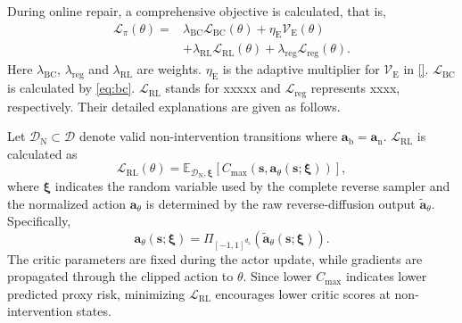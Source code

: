 \documentclass[9pt,journal]{IEEEtran}
\newcommand{\D}{\mathcal{D}}
\newcommand{\DN}{\mathcal{D}_{\mathrm{N}}}
\newcommand{\E}{\mathbb{E}}
\newcommand{\va}{\bm{a}}
\newcommand{\vs}{\bm{s}}
\newcommand{\van}{\ensuremath{\va_{\mathrm n}}}      %
\newcommand{\vab}{\ensuremath{\va_{\mathrm b}}}      %
\begin{document}
During online repair, a comprehensive objective is calculated, that is,
\begin{equation}
    \begin{aligned}
        \mathcal{L}_{\pi}(\theta)
        ={}&
        \lambda_{\mathrm{BC}}
        \mathcal{L}_{\mathrm{BC}}(\theta)
        +
        \eta_{\mathrm{E}}
        \mathcal{V}_{\mathrm{E}}(\theta)
        \\
        &+
        \lambda_{\mathrm{RL}}
        \mathcal{L}_{\mathrm{RL}}(\theta)
        +
        \lambda_{\mathrm{reg}}
        \mathcal{L}_{\mathrm{reg}}(\theta).
    \end{aligned}
    \label{eq:actorloss}
\end{equation}
Here $\lambda_{\mathrm{BC}}$, $\lambda_{\mathrm{reg}}$ and $\lambda_{\mathrm{RL}}$ are weights.
$\eta_{\mathrm E}$ is the adaptive multiplier for
$\mathcal V_{\mathrm E}$ in \eqref{}.%
$\mathcal{L}_{\mathrm{BC}}$ is calculated by \eqref{eq:bc}.
$\mathcal{L}_{\mathrm{RL}}$ stands for xxxxx and $\mathcal{L}_{\mathrm{reg}}$ represents xxxx, respectively.
Their detailed explanations are given as follows.

Let $\DN\subset\D$ denote valid non-intervention
transitions where $\vab=\van$. $\mathcal{L}_{\mathrm{RL}}$ is calculated as
\begin{equation}
    \mathcal{L}_{\mathrm{RL}}(\theta)
    =
    \E_{\DN,\bm\xi}
    \left[
    C_{\max}
    \left(
    \vs,
    \va_\theta\!\left(\vs;\bm\xi\right)
    \right)
    \right],
    \label{eq:actor_rl}
\end{equation}
where $\bm\xi$ indicates the random variable used by the complete
reverse sampler and the normalized action $\va_\theta$ is determined by the raw reverse-diffusion output $\tilde{\va}_\theta$. Specifically,
\begin{equation}
    \va_\theta\!\left(\vs;\bm\xi\right)
    =
    \Pi_{[-1,1]^{d_{\mathrm a}}}
    \left(
    \tilde{\va}_\theta\!\left(\vs;\bm\xi\right)
    \right).
    \label{eq:actor_clip}
\end{equation}
The critic parameters are fixed during the actor update,
while gradients are propagated through the clipped action
to $\theta$. Since lower $C_{\max}$ indicates lower
predicted proxy risk, minimizing $\mathcal L_{\mathrm{RL}}$
encourages lower critic scores at non-intervention states.
\end{document}
